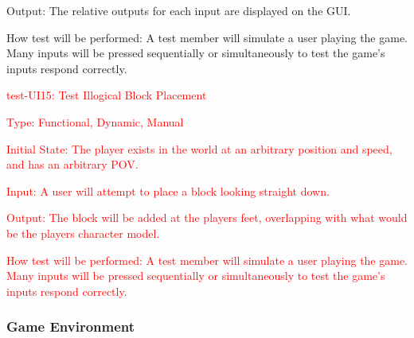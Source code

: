 \documentclass[12pt, titlepage]{article}
\begin{document}
\begin{enumerate}
Output: The relative outputs for each input are displayed on the GUI.
					
How test will be performed: A test member will simulate a user playing the game. Many inputs will be pressed sequentially or simultaneously to test the game's inputs respond correctly.

\textcolor{red}{\item{test-UI15: Test Illogical Block Placement\\}}

\textcolor{red}{Type: Functional, Dynamic, Manual}
					
\textcolor{red}{Initial State: The player exists in the world at an arbitrary position and speed, and has an arbitrary POV.}
					
\textcolor{red}{Input: A user will attempt to place a block looking straight down.}
					
\textcolor{red}{Output: The block will be added at the players feet, overlapping with what would be the players character model.}
					
\textcolor{red}{How test will be performed: A test member will simulate a user playing the game. Many inputs will be pressed sequentially or simultaneously to test the game's inputs respond correctly.}

\end{enumerate}

\subsubsection{Game Environment}
\end{document}
